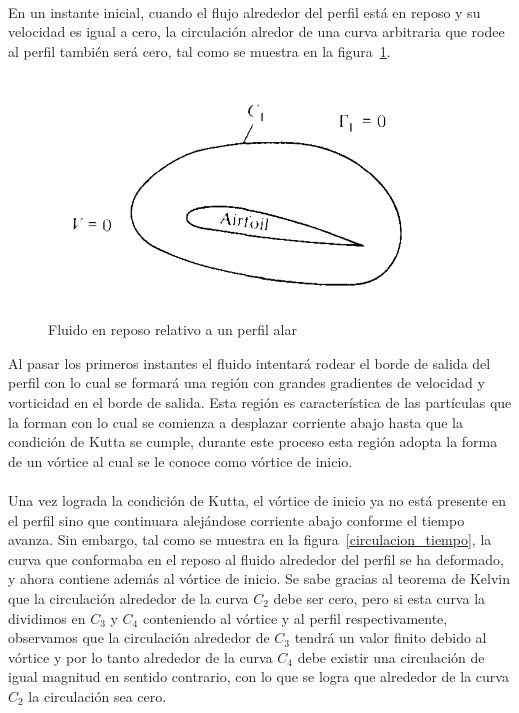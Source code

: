 \documentclass[letterpaper, openright, 12pt]{book}
\begin{document}
    \paragraph*{}
        En un instante inicial, cuando el flujo alrededor del perfil está en
        reposo y su velocidad es igual a cero, la circulación alredor de una
        curva arbitraria que rodee al perfil también será cero, tal como se
        muestra en la figura~\ref{circulacion_reposo}.

        \begin{figure}[htbp!]
            \centering
            \includegraphics[keepaspectratio, width=115mm]{./img/circulacion_reposo}
            \caption[Fluido en reposo relativo a un perfil alar]{Fluido en
                reposo relativo a un perfil alar\cite{anderson_fundamentals}}
            \label{circulacion_reposo}
        \end{figure}

        Al pasar los primeros instantes el fluido intentará rodear el borde de
        salida del perfil con lo cual se formará una región con grandes
        gradientes de velocidad y vorticidad en el borde de salida. Esta región
        es característica de las partículas que la forman con lo cual se
        comienza a desplazar corriente abajo hasta que la condición de Kutta se
        cumple, durante este proceso esta región adopta la forma de un vórtice
        al cual se le conoce como vórtice de inicio.

    \paragraph*{}
        Una vez lograda la condición de Kutta, el vórtice de inicio ya no está
        presente en el perfil sino que continuara alejándose corriente abajo
        conforme el tiempo avanza. Sin embargo, tal como se muestra en la
        figura~\ref{circulacion_tiempo}, la curva que conformaba en el reposo
        al fluido alrededor del perfil se ha deformado, y ahora contiene además
        al vórtice de inicio. Se sabe gracias al teorema de Kelvin que la
        circulación alrededor de la curva $C_2$ debe ser cero, pero si esta
        curva la dividimos en $C_3$ y $C_4$ conteniendo al vórtice y al perfil
        respectivamente, observamos que la circulación alrededor de $C_3$
        tendrá un valor finito debido al vórtice y por lo tanto alrededor de la
        curva $C_4$ debe existir una circulación de igual magnitud en sentido
        contrario, con lo que se logra que alrededor de la curva $C_2$ la
        circulación sea cero.
\end{document}
